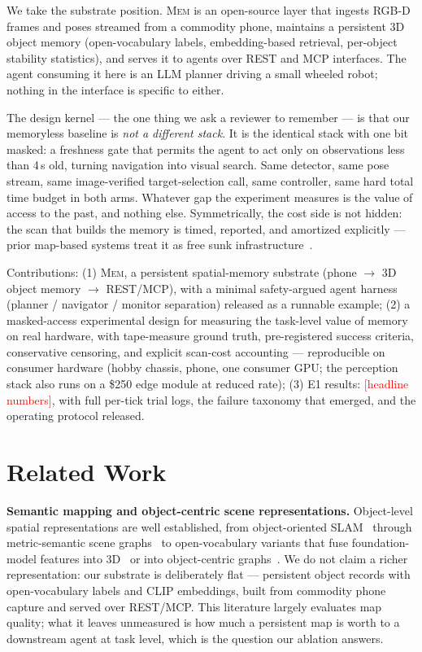 \documentclass{article}
\newcommand{\todo}[1]{\textcolor{red}{[#1]}}
\newcommand{\rtsm}{\textsc{Mem}} %
\begin{document}
We take the substrate position. \rtsm{} is an open-source layer that
ingests RGB-D frames and poses streamed from a commodity phone,
maintains a persistent 3D object memory (open-vocabulary labels,
embedding-based retrieval, per-object stability statistics), and serves
it to agents over REST and MCP interfaces. The agent consuming it here
is an LLM planner driving a small wheeled robot; nothing in the
interface is specific to either.

The design kernel --- the one thing we ask a reviewer to remember ---
is that our memoryless baseline is \emph{not a different stack}. It is
the identical stack with one bit masked: a freshness gate that permits
the agent to act only on observations less than 4\,s old, turning
navigation into visual search. Same detector, same pose stream, same
image-verified target-selection call, same controller, same hard total
time budget in both arms. Whatever gap the experiment measures is the
value of access to the past, and nothing else. Symmetrically, the cost
side is not hidden: the scan that builds the memory is timed, reported,
and amortized explicitly --- prior map-based systems treat it as free
sunk infrastructure~\cite{Liu2024}.

Contributions: (1) \rtsm{}, a persistent spatial-memory substrate
(phone $\to$ 3D object memory $\to$ REST/MCP), with a minimal
safety-argued agent harness (planner / navigator / monitor separation)
released as a runnable example; (2) a masked-access experimental design
for measuring the task-level value of memory on real hardware, with
tape-measure ground truth, pre-registered success criteria,
conservative censoring, and explicit scan-cost accounting ---
reproducible on consumer hardware (hobby chassis, phone, one consumer
GPU; the perception stack also runs on a \$250 edge module at reduced
rate); (3) E1 results: \todo{headline numbers}, with full per-tick
trial logs, the failure taxonomy that emerged, and the operating
protocol released.

\section{Related Work}

\textbf{Semantic mapping and object-centric scene representations.}
Object-level spatial representations are well established, from
object-oriented SLAM~\cite{SalasMoreno2013} through metric-semantic
scene graphs~\cite{Rosinol2020} to open-vocabulary variants that fuse
foundation-model features into 3D~\cite{Jatavallabhula2023,Huang2023}
or into object-centric graphs~\cite{Gu2024,Werby2024}. We do not claim
a richer representation: our substrate is deliberately flat ---
persistent object records with open-vocabulary labels and CLIP
embeddings, built from commodity phone capture and served over
REST/MCP\@. This literature largely evaluates map quality; what it
leaves unmeasured is how much a persistent map is worth to a downstream
agent at task level, which is the question our ablation answers.
\end{document}
